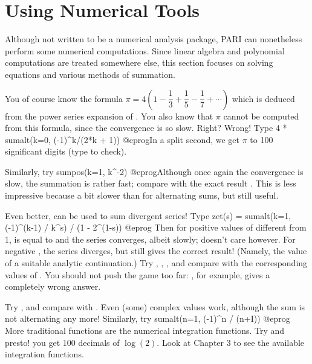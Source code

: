 \section{Using Numerical Tools}

 Although not written to be a numerical analysis package, PARI can
nonetheless perform some numerical computations. Since linear algebra and
polynomial computations are treated somewhere else, this section focuses on
solving equations and various methods of summation.

You of course know the formula $\pi = 4(1-\dfrac13+\dfrac15-\dfrac17+\cdots)$
which is deduced from the power series expansion of . You also
know that $\pi$ cannot be computed from this formula, since the convergence
is so slow. Right? Wrong! Type
\bprog
  4 * sumalt(k=0, (-1)^k/(2*k + 1))
@eprog\noindent In a split second, we get $\pi$ to 100 significant digits
(type  to check).

Similarly, try
\bprog
  sumpos(k=1, k^-2)
@eprog\noindent Although once again the convergence is slow, the summation is
rather fast; compare with the exact result . This is less
impressive because a bit slower than for alternating sums, but still useful.

Even better,  can be used to sum divergent series! Type
\bprog
  zet(s) = sumalt(k=1, (-1)^(k-1) / k^s) / (1 - 2^(1-s))
@eprog\noindent
Then for positive values of  different from 1,  is equal
to  and the series converges, albeit slowly; 
doesn't care however. For negative , the series diverges, but
 still gives the correct result! (Namely, the value of a suitable
analytic continuation.) Try , , ,
and compare with the corresponding values of . You should not push
the game too far: , for example, gives a completely wrong
answer.

Try , and compare with . Even (some) complex values
work, although the sum is not alternating any more! Similarly, try
\bprog
  sumalt(n=1, (-1)^n / (n+I))
@eprog
\medskip
More traditional functions are the numerical integration functions. Try
 and presto! you get 100 decimals of $\log(2)$. Look
at Chapter 3 to see the available integration functions.

